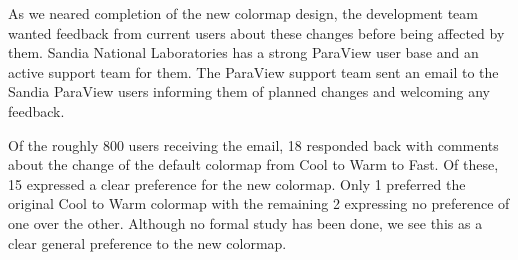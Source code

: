 \documentclass{IEEEcsmag}
\begin{document}



As we neared completion of the new colormap design, the development team wanted feedback from current users about these changes before being affected by them.
Sandia National Laboratories has a strong ParaView user base and an active support team for them.
The ParaView support team sent an email to the Sandia ParaView users informing them of planned changes and welcoming any feedback.

Of the roughly 800 users receiving the email, 18 responded back with comments about the change of the default colormap from Cool to Warm to Fast.
Of these, 15 expressed a clear preference for the new colormap.
Only 1 preferred the original Cool to Warm colormap with the remaining 2 expressing no preference of one over the other.
Although no formal study has been done, we see this as a clear general preference to the new colormap.
\end{document}
